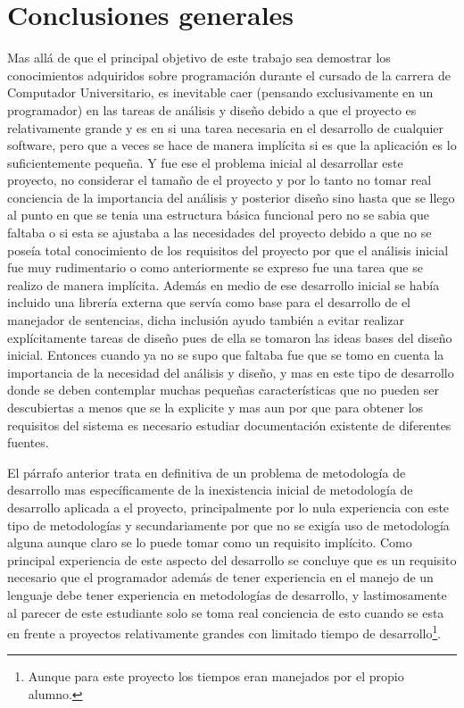 \section{Conclusiones generales}    
%
Mas allá de que el principal objetivo de este trabajo sea demostrar los conocimientos adquiridos sobre programación durante el cursado de la carrera de Computador Universitario, es inevitable caer (pensando exclusivamente en un programador) en las tareas de análisis y diseño debido a que el proyecto es relativamente grande y es en si una tarea necesaria en el desarrollo de cualquier software, pero que a veces se hace de manera implícita si es que la aplicación es lo suficientemente pequeña. Y fue ese el problema inicial al desarrollar este proyecto, no considerar el tamaño de el proyecto y por lo tanto no tomar real conciencia de la importancia del análisis y posterior diseño sino hasta que se llego al punto en que se tenia una estructura básica funcional pero no se sabia que faltaba o si esta se ajustaba a las necesidades del proyecto debido a que no se poseía total conocimiento de los requisitos del proyecto por que el análisis inicial fue muy rudimentario o como anteriormente se expreso fue una tarea que se realizo de manera implícita. Además en medio de ese desarrollo inicial se había incluido una librería externa que servía como base para el desarrollo de el manejador de sentencias, dicha inclusión ayudo también a evitar realizar explícitamente tareas de diseño pues de ella se tomaron las ideas bases del diseño inicial. Entonces cuando ya no se supo que faltaba fue que se tomo en cuenta la importancia de la necesidad del análisis y diseño, y mas en este tipo de desarrollo donde se deben contemplar muchas pequeñas características que no pueden ser descubiertas a menos que se la explicite y mas aun por que para obtener los requisitos del sistema es necesario estudiar documentación existente de diferentes fuentes.

El párrafo anterior trata en definitiva de un problema de metodología de desarrollo mas específicamente de la inexistencia inicial de metodología de desarrollo aplicada a el proyecto, principalmente por lo nula experiencia con este tipo de metodologías y secundariamente por que no se exigía uso de metodología alguna aunque claro se lo puede tomar como un requisito implícito. Como principal experiencia de este aspecto del desarrollo se concluye que es un requisito necesario que el programador además de tener experiencia en el manejo de un lenguaje debe tener experiencia en metodologías de desarrollo, y lastimosamente al parecer de este estudiante solo se toma real conciencia de esto cuando se esta en frente a proyectos relativamente grandes con limitado tiempo de desarrollo\footnote{Aunque para este proyecto los tiempos eran manejados por el propio alumno.}.

